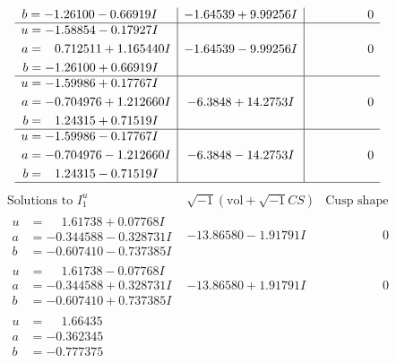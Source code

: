 \documentclass[1p]{elsarticle_modified}
\theoremstyle{definition}
\newcommand{\I}{\sqrt{-1}}
\begin{document}
$$\begin{array}{c|c|c}
\begin{aligned}
b &= -1.26100 - 0.66919 I\end{aligned}
 & -1.64539 + 9.99256 I & \phantom{-0.000000 } 0 \\ \hline\begin{aligned}
u &= -1.58854 - 0.17927 I \\
a &= \phantom{-}0.712511 + 1.165440 I \\
b &= -1.26100 + 0.66919 I\end{aligned}
 & -1.64539 - 9.99256 I & \phantom{-0.000000 } 0 \\ \hline\begin{aligned}
u &= -1.59986 + 0.17767 I \\
a &= -0.704976 + 1.212660 I \\
b &= \phantom{-}1.24315 + 0.71519 I\end{aligned}
 & -6.3848 + 14.2753 I & \phantom{-0.000000 } 0 \\ \hline\begin{aligned}
u &= -1.59986 - 0.17767 I \\
a &= -0.704976 - 1.212660 I \\
b &= \phantom{-}1.24315 - 0.71519 I\end{aligned}
 & -6.3848 - 14.2753 I & \phantom{-0.000000 } 0\\
 \hline 
 \end{array}$$\newpage$$\begin{array}{c|c|c}  
\text{Solutions to }I^u_{1}& \I (\text{vol} + \sqrt{-1}CS) & \text{Cusp shape}\\
 \hline 
\begin{aligned}
u &= \phantom{-}1.61738 + 0.07768 I \\
a &= -0.344588 - 0.328731 I \\
b &= -0.607410 - 0.737385 I\end{aligned}
 & -13.86580 - 1.91791 I & \phantom{-0.000000 } 0 \\ \hline\begin{aligned}
u &= \phantom{-}1.61738 - 0.07768 I \\
a &= -0.344588 + 0.328731 I \\
b &= -0.607410 + 0.737385 I\end{aligned}
 & -13.86580 + 1.91791 I & \phantom{-0.000000 } 0 \\ \hline\begin{aligned}
u &= \phantom{-}1.66435\phantom{ +0.000000I} \\
a &= -0.362345\phantom{ +0.000000I} \\
b &= -0.777375\phantom{ +0.000000I}\end{aligned}

\end{array}$$
\end{document}
